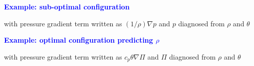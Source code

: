 \documentclass[a4]{seminar}
\newcommand{\B}[1]{\textcolor{blue}{#1}}
\begin{document}

\begin{slide}

\begin{center}
\end{center}

\end{slide}


\begin{slide}

\B{\bf Example: sub-optimal configuration}


\begin{center}
\end{center}

with pressure gradient term written as \( (1 / \rho ) \nabla p \)
and \( p \) diagnosed from \( \rho \) and \( \theta \)


\end{slide}


\begin{slide}

\begin{center}
\end{center}


\end{slide}


\begin{slide}

\B{\bf Example: optimal configuration predicting \( \rho \)}


\begin{center}
\end{center}

with pressure gradient term written as \( c_p \theta \nabla \Pi \)
and \( \Pi \) diagnosed from \( \rho \) and \( \theta \)


\end{slide}

\end{document}
